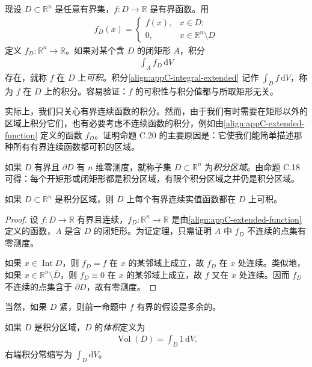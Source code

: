 \documentclass[../../main.tex]{subfiles}
\begin{document}
现设 $D\subset\mathbb R^n$ 是任意有界集，$f:D\to\mathbb R$ 是有界函数。用
\begin{align}\label{align:appC-extended-function}
f_D(x)=\begin{cases}f(x),&x\in D;\\0,&x\in\mathbb R^n\setminus D\end{cases}
\end{align}
定义 $f_D:\mathbb R^n\to\mathbb R$。如果对某个含 $D$ 的闭矩形 $A$，积分
\begin{align}\label{align:appC-integral-extended}
\int_A f_D\,\mathrm{d}V
\end{align}
存在，就称 $f$ 在 $D$ 上\emph{可积}。积分\eqref{align:appC-integral-extended} 记作 $\int_D f\,\mathrm{d}V$，称为 $f$ 在 $D$ 上的积分。容易验证：$f$ 的可积性与积分值都与所取矩形无关。

实际上，我们只关心有界连续函数的积分。然而，由于我们有时需要在矩形以外的区域上积分它们，也有必要考虑不连续函数的积分，例如由\eqref{align:appC-extended-function} 定义的函数 $f_D$。证明命题 C.20 的主要原因是：它使我们能简单描述那种所有有界连续函数都可积的区域。

如果 $D$ 有界且 $\partial D$ 有 $n$ 维零测度，就称子集 $D\subset\mathbb R^n$ 为\emph{积分区域}。由命题 C.18 可得：每个开矩形或闭矩形都是积分区域，有限个积分区域之并仍是积分区域。

\begin{proposition}\label{proposition:appC-integral-domain}
如果 $D\subset\mathbb R^n$ 是积分区域，则 $D$ 上每个有界连续实值函数都在 $D$ 上可积。
\end{proposition}

\begin{proof}
设 $f:D\to\mathbb R$ 有界且连续，$f_D:\mathbb R^n\to\mathbb R$ 是由\eqref{align:appC-extended-function} 定义的函数，$A$ 是含 $D$ 的闭矩形。为证定理，只需证明 $A$ 中 $f_D$ 不连续的点集有零测度。

如果 $x\in\operatorname{Int}D$，则 $f_D=f$ 在 $x$ 的某邻域上成立，故 $f_D$ 在 $x$ 处连续。类似地，如果 $x\in\mathbb R^n\setminus\overline D$，则 $f_D\equiv0$ 在 $x$ 的某邻域上成立，故 $f$ 又在 $x$ 处连续。因而 $f_D$ 不连续的点集含于 $\partial D$，故有零测度。
\end{proof}

当然，如果 $D$ 紧，则前一命题中 $f$ 有界的假设是多余的。

如果 $D$ 是积分区域，$D$ 的\emph{体积}定义为
\begin{align}\label{align:appC-domain-volume}
\operatorname{Vol}(D)=\int_D 1\,\mathrm{d}V.
\end{align}
右端积分常缩写为 $\int_D\mathrm{d}V$。
\end{document}

